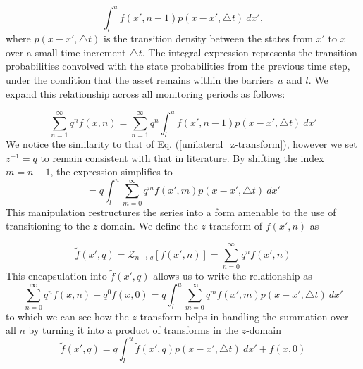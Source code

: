 \documentclass[a4paper]{report}
\begin{document}
\begin{equation}
\int^u_l f(x', n-1)p(x - x', \triangle t)\ dx',	
\end{equation}
where $p(x - x', \triangle t)$ is the transition density between the states from $x'$ to $x$ over a small time increment $\triangle t$. The integral expression represents the transition probabilities convolved with the state probabilities from the previous time step, under the condition that the asset remains within the barriers $u$ and $l$. We expand this relationship across all monitoring periods as follows:

\begin{equation}
\sum^{\infty}_{n = 1} q^n f(x, n) = \sum^{\infty}_{n = 1} q^n \int^u_l f(x', n-1)p(x - x', \triangle t)\ dx'	
\end{equation}
We notice the similarity to that of Eq. (\ref{unilateral_z-transform}), however we set $z^{-1} = q$ to remain consistent with that in literature. By shifting the index $m = n-1$, the expression simplifies to
\begin{equation}
= q \int^u_l \sum^{\infty}_{m = 0} q^m f(x', m) p(x - x', \triangle t)\ dx'	
\end{equation}
This manipulation restructures the series into a form amenable to the use of transitioning to the $z$-domain. We define the $z$-transform of $f(x', n)$ as

\begin{equation}
\tilde{f}(x', q) = \mathcal{Z}_{n \rightarrow q}[f(x', n)] = \sum^{\infty}_{n = 0} q^nf(x', n)
\end{equation}
This encapsulation into $\tilde{f}(x', q)$ allows us to write the relationship as
\begin{equation}
\sum^{\infty}_{n = 0} q^n f(x, n) -q^0f(x, 0) = q\int^u_l \sum^{\infty}_{m = 0}q^m f(x', m) p(x-x', \triangle t)\ dx'	
\end{equation}
to which we can see how the $z$-transform helps in handling the summation over all $n$ by turning it into a product of transforms in the $z$-domain
\begin{equation}
\tilde{f}(x', q) = q\int^u_l \tilde{f}(x', q)p(x - x', \triangle t)\ dx' + f(x, 0)
\end{equation}
\end{document}
